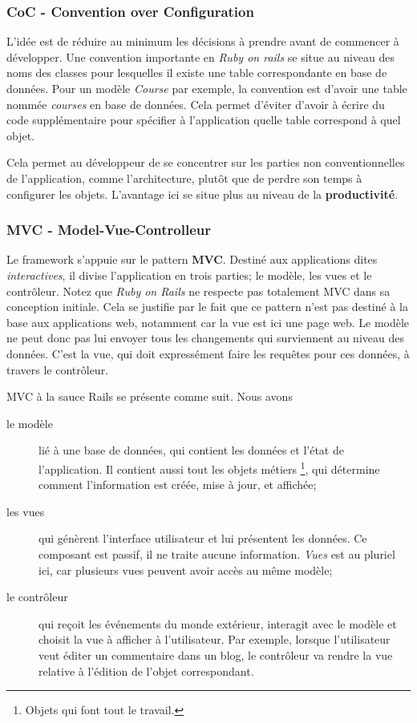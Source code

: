\subsubsection{CoC - Convention over Configuration}
L'idée est de réduire au minimum les décisions à prendre avant de commencer à développer. Une convention importante en \textit{Ruby on rails} se situe au niveau des noms des classes pour lesquelles il existe une table correspondante en base de données. Pour un modèle \textit{Course} par exemple, la convention est d'avoir une table nommée \textit{courses} en base de données. Cela permet d'éviter d'avoir à écrire du code supplémentaire pour spécifier à l'application quelle table correspond à quel objet. 

Cela permet au développeur de se concentrer sur les parties non conventionnelles de l'application, comme l'architecture, plutôt que de perdre son temps à configurer les objets. L'avantage ici se situe plus au niveau de la \textbf{productivité}.
\subsubsection{MVC - Model-Vue-Controlleur}

Le framework s'appuie sur le pattern \textbf{MVC}. Destiné aux applications dites \textit{interactives}, il divise l'application en trois parties; le modèle, les vues et le contrôleur. Notez que \textit{Ruby on Rails} ne respecte pas totalement MVC dans sa conception initiale. Cela se justifie par le fait que ce pattern n'est pas destiné à la base aux applications web, notamment car la vue est ici une page web. Le modèle ne peut donc pas lui envoyer tous les changements qui surviennent au niveau des données. C'est la vue, qui doit expressément faire les requêtes pour ces données, à travers le contrôleur.

MVC à la sauce Rails se présente comme suit. Nous avons

\begin{description}
\item[le modèle] lié à une base de données, qui contient les données et l'état de l'application. Il contient aussi tout les objets métiers \footnote{Objets qui font tout le travail.}, qui détermine comment l'information est créée, mise à jour, et affichée;
\item[les vues] qui génèrent l'interface utilisateur et lui présentent les données. Ce composant est passif, il ne traite aucune information. \textit{Vues} est au pluriel ici, car plusieurs vues peuvent avoir accès au même modèle;
\item[le contrôleur] qui reçoit les événements du monde extérieur, interagit avec le modèle et choisit la vue à afficher à l'utilisateur. Par exemple, lorsque l'utilisateur veut éditer un commentaire dans un blog, le contrôleur va rendre la vue relative à l'édition de l'objet correspondant. 
\end{description} 

